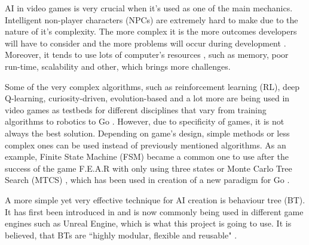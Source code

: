 \documentclass[journal]{IEEEtran}
\begin{document}
AI in video games is very crucial when it's used as one of the main mechanics. Intelligent non-player characters (NPCs) are extremely hard to make due to the nature of it's complexity. The more complex it is the more outcomes developers will have to consider and the more problems will occur during development \cite{gdchalo2}. Moreover, it tends to use lots of computer's resources \cite{gdchalo2}, such as memory, poor run-time, scalability and other, which brings more challenges.

Some of the very complex algorithms, such as reinforcement learning (RL), deep Q-learning, curiosity-driven, evolution-based and a lot more are being used in video games as testbeds for different disciplines that vary from training algorithms \cite{aiinvideogames}\cite{robotplayground} to robotics \cite{schmidhuber2006developmental}\cite{colledanchise2018behavior}\cite{brady1985artificial}\cite{oudeyer2004intelligent} to Go \cite{schaul2011measuring}\cite{alphago}. However, due to specificity of games, it is not always the best solution. Depending on game's design, simple methods or less complex ones can be used instead of previously mentioned algorithms. As an example, Finite State Machine (FSM) became a common one to use after the success of the game F.E.A.R with only using three states \cite{orkin2006three} or Monte Carlo Tree Search (MTCS) \cite{chaslot2008monte}, which has been used in creation of a new paradigm for Go \cite{gelly2011monte}\cite{gelly2012grand}. 

A more simple yet very effective technique for AI creation is behaviour tree (BT). It has first been introduced in \cite{gdchalo2} and is now commonly being used in different game engines such as Unreal Engine, which is what this project is going to use. It is believed, that BTs are ``highly modular, flexible and reusable" \cite{colledanchise2017behavior}.
\end{document}
